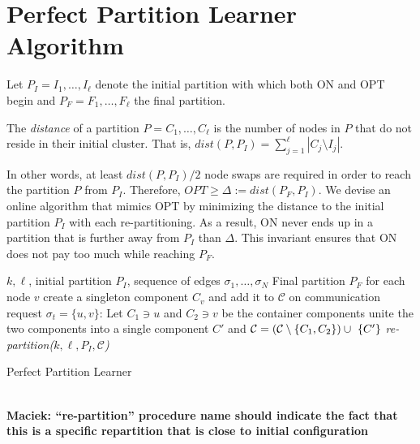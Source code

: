 \documentclass[manuscript,screen=true]{acmart}
\DeclarePairedDelimiter\set{\{}{\}}
\newcommand\maciek[1]{\color{brown}\textbf{\\ Maciek: #1}\color{black}}
\begin{document}
\section{Perfect Partition Learner Algorithm}
    
     
Let $P_I = I_1, \dots, I_{\ell}$ denote the initial partition with which both ON and OPT begin and
$P_F = F_1, \dots, F_{\ell}$ the final partition.
\begin{definition}	\label{def:dist}
    The \emph{distance} of a partition $P = C_1, \dots, C_{\ell}$ is the number of nodes in $P$ that do not reside in their initial cluster.
    That is,
    $dist(P, P_I) = \sum_{j=1}^{\ell} | C_j \setminus I_j |$. 
\end{definition}

In other words,
at least $dist(P, P_I)/2$ node swaps are required in order to reach the partition $P$ from $P_I$.
Therefore,
$OPT \geq \Delta:= dist(P_F, P_I) $.
We devise an online algorithm that mimics OPT by minimizing the distance to the initial partition $P_I$ with each re-partitioning.
As a result,
ON never ends up in a partition that is further away from $P_I$ than $\Delta$.
This invariant ensures that ON does not pay too much while reaching $P_F$.

\begin{algorithm}
    \renewcommand{\algorithmicrequire}{\textbf{Input:}}
    \renewcommand{\algorithmicensure}{\textbf{Output:}}
    \begin{algorithmic}[1]
        \Require 
        $k, \ell$,
        initial partition $P_I$,
        sequence of  edges $\sigma_1, \dots, \sigma_N$ 
        \Ensure Final partition $P_F$ 
        \State for each node $v$ create a singleton component $C_v$ and add it to $\mathcal{C}$ \label{line:initcomponents}
        \State on communication request $\sigma_t=\{u,v\}$:
        \State Let $C_1 \ni u$ and $C_2 \ni v$ be the container components
        \State unite the two components into a single component $C'$ and
        $\mathcal{C} = (\mathcal{C}\setminus\set{C_1, C_2}) \cup ~\set{C'}$ \label{line:mergecomponents}
        \State \textit{re-partition($k, \ell, P_I, \mathcal{C}$)} \label{line:rebalance} 
        \EndIf
        \EndIf
    \end{algorithmic}
    \caption{Perfect Partition Learner}
    \label{alg:ppl}
      \end{algorithm}

      \maciek{``re-partition'' procedure name should indicate the fact that this is a specific repartition that is close to initial configuration}
\end{document}
